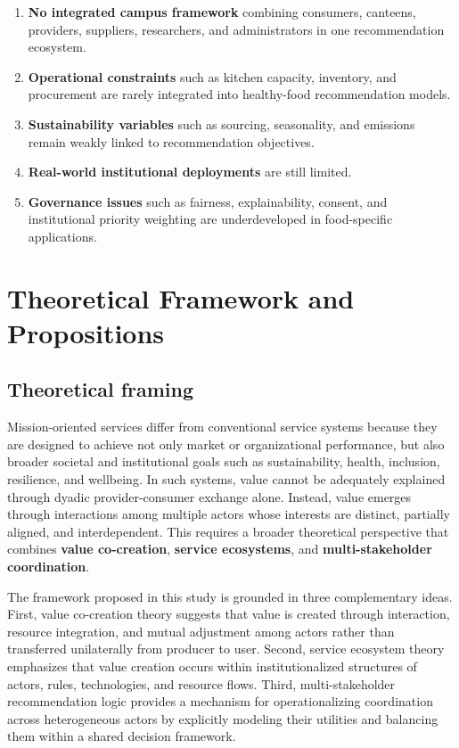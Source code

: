 \documentclass[
  letterpaper,
  DIV=11,
  numbers=noendperiod]{scrartcl}
\providecommand{\tightlist}{%
  \setlength{\itemsep}{0pt}\setlength{\parskip}{0pt}}
\begin{document}
\begin{enumerate}
\def\labelenumi{\arabic{enumi}.}
\tightlist
\item
  \textbf{No integrated campus framework} combining consumers, canteens,
  providers, suppliers, researchers, and administrators in one
  recommendation ecosystem.
\item
  \textbf{Operational constraints} such as kitchen capacity, inventory,
  and procurement are rarely integrated into healthy-food recommendation
  models.
\item
  \textbf{Sustainability variables} such as sourcing, seasonality, and
  emissions remain weakly linked to recommendation objectives.
\item
  \textbf{Real-world institutional deployments} are still limited.
\item
  \textbf{Governance issues} such as fairness, explainability, consent,
  and institutional priority weighting are underdeveloped in
  food-specific applications.
\end{enumerate}

\section{Theoretical Framework and
Propositions}\label{theoretical-framework-and-propositions}

\subsection{Theoretical framing}\label{theoretical-framing}

Mission-oriented services differ from conventional service systems
because they are designed to achieve not only market or organizational
performance, but also broader societal and institutional goals such as
sustainability, health, inclusion, resilience, and wellbeing. In such
systems, value cannot be adequately explained through dyadic
provider-consumer exchange alone. Instead, value emerges through
interactions among multiple actors whose interests are distinct,
partially aligned, and interdependent. This requires a broader
theoretical perspective that combines \textbf{value co-creation},
\textbf{service ecosystems}, and \textbf{multi-stakeholder
coordination}.

The framework proposed in this study is grounded in three complementary
ideas. First, value co-creation theory suggests that value is created
through interaction, resource integration, and mutual adjustment among
actors rather than transferred unilaterally from producer to user.
Second, service ecosystem theory emphasizes that value creation occurs
within institutionalized structures of actors, rules, technologies, and
resource flows. Third, multi-stakeholder recommendation logic provides a
mechanism for operationalizing coordination across heterogeneous actors
by explicitly modeling their utilities and balancing them within a
shared decision framework.
\end{document}
